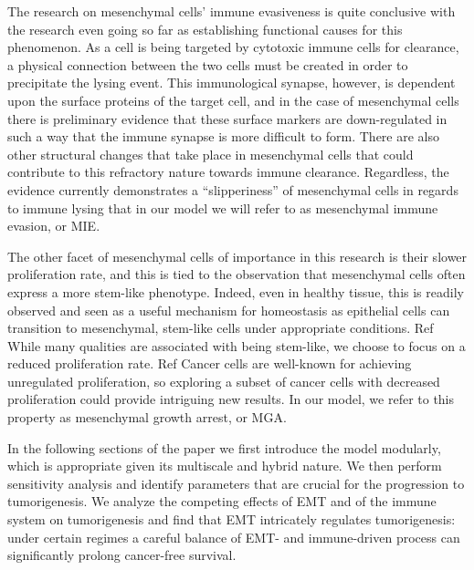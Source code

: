 \documentclass[11pt, a4paper, preprint]{article}
\begin{document}
The research on mesenchymal cells' immune evasiveness is quite conclusive with the research even going so far as establishing functional causes for this phenomenon.
As a cell is being targeted by cytotoxic immune cells for clearance, a physical connection between the two cells must be created in order to precipitate the lysing event.
This immunological synapse, however, is dependent upon the surface proteins of the target cell, and in the case of mesenchymal cells there is preliminary evidence that these surface markers are down-regulated in such a way that the immune synapse is more difficult to form\cite{terry2017new}.
There are also other structural changes that take place in mesenchymal cells that could contribute to this refractory nature towards immune clearance.
Regardless, the evidence currently demonstrates a ``slipperiness'' of mesenchymal cells in regards to immune lysing that in our model we will refer to as mesenchymal immune evasion, or MIE.

The other facet of mesenchymal cells of importance in this research is their slower proliferation rate, and this is tied to the observation that mesenchymal cells often express a more stem-like phenotype.
Indeed, even in healthy tissue, this is readily observed and seen as a useful mechanism for homeostasis as epithelial cells can transition to mesenchymal, stem-like cells under appropriate conditions. Ref
While many qualities are associated with being stem-like, we choose to focus on a reduced proliferation rate. Ref
Cancer cells are well-known for achieving unregulated proliferation, so exploring a subset of cancer cells with decreased proliferation could provide intriguing new results.
In our model, we refer to this property as mesenchymal growth arrest, or MGA.

In the following sections of the paper we first introduce the model modularly, which is appropriate given its multiscale and hybrid nature.
We then perform sensitivity analysis and identify parameters that are crucial for the progression to tumorigenesis.
We analyze the competing effects of EMT and of the immune system on tumorigenesis and find that EMT intricately regulates tumorigenesis: under certain regimes a careful balance of EMT- and immune-driven process can significantly prolong cancer-free survival.


\end{document}
